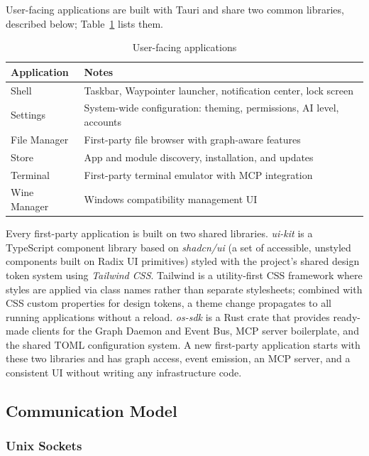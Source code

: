 User-facing applications are built with Tauri and share two common libraries,
described below; Table~\ref{tab:apps} lists them.

\begin{table}[htbp]
\caption{User-facing applications}
\label{tab:apps}
\begin{tabularx}{\linewidth}{lX}
\toprule
\textbf{Application} & \textbf{Notes} \\
\midrule
Shell        & Taskbar, Waypointer launcher, notification center, lock screen \\
Settings     & System-wide configuration: theming, permissions, AI level, accounts \\
File Manager & First-party file browser with graph-aware features \\
Store        & App and module discovery, installation, and updates \\
Terminal     & First-party terminal emulator with MCP integration \\
Wine Manager & Windows compatibility management UI \\
\bottomrule
\end{tabularx}
\end{table}

Every first-party application is built on two shared libraries. \emph{ui-kit}
is a TypeScript component library based on \emph{shadcn/ui} (a set of
accessible, unstyled components built on Radix UI primitives) styled with the
project's shared design token system using \emph{Tailwind CSS}. Tailwind is a
utility-first CSS framework where styles are applied via class names rather
than separate stylesheets; combined with CSS custom properties for design
tokens, a theme change propagates to all running applications without a
reload. \emph{os-sdk} is a Rust crate that provides ready-made clients for
the Graph Daemon and Event Bus, MCP server boilerplate, and the shared TOML
configuration system. A new first-party application starts with these two
libraries and has graph access, event emission, an MCP server, and a
consistent UI without writing any infrastructure code.

\subsection{Communication Model}
\label{sec:communication}

\subsubsection{Unix Sockets}
\label{sec:unix-sockets}

